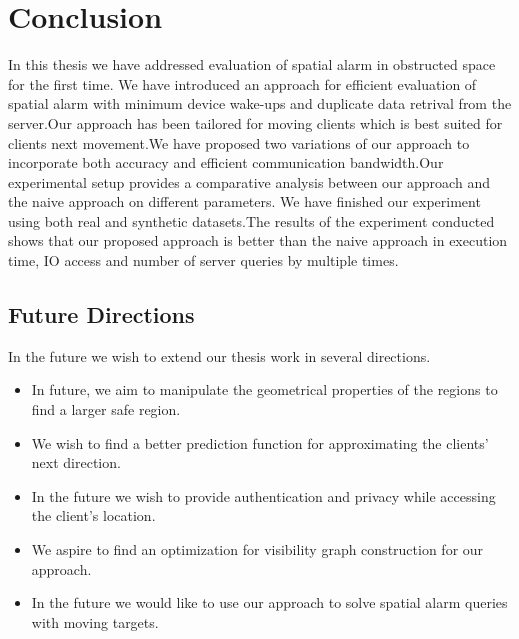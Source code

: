 \chapter{Conclusion}
\label{chp:conclusion}
In this thesis we have addressed evaluation of spatial alarm in obstructed space for the first time. We have introduced an approach for efficient evaluation of spatial alarm with minimum device wake-ups and duplicate data retrival from the server.Our approach has been tailored for moving clients which is best suited for clients next movement.We have proposed two variations of our approach to incorporate both accuracy and efficient communication bandwidth.Our experimental setup provides a comparative analysis between our approach and the naive approach on different parameters. We have finished our experiment using both real and synthetic datasets.The results of the experiment conducted shows that our proposed approach is better than the naive approach in execution time, IO access and number of server queries by multiple times.  

\vspace{5pt}
\section{Future Directions}
In the future we wish to extend our thesis work in several directions. 

\begin{itemize}
    \item In future, we aim to manipulate the geometrical properties of the regions to find a larger safe region.
    \item We wish to find a better prediction function for approximating the clients' next direction. 
    \item In the future we wish to provide authentication and privacy while accessing the client's location.
    \item We aspire to find an optimization for visibility graph construction for our approach.
    \item In the future we would like to use our approach to solve spatial alarm queries with moving targets. 

\end{itemize}


\endinput

